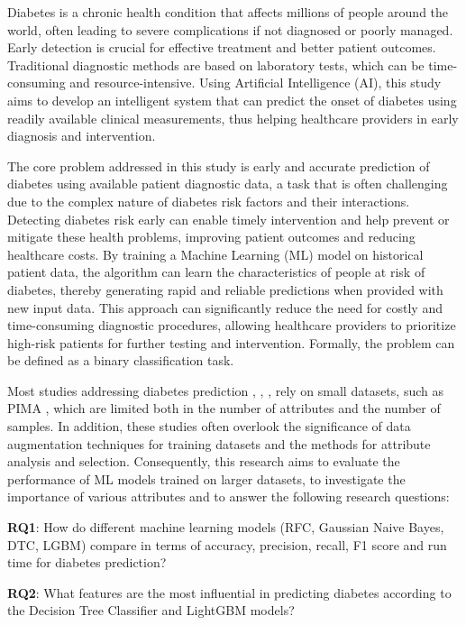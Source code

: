 \documentclass[runningheads]{llncs}
\begin{document}
Diabetes is a chronic health condition that affects millions of people around the world, often leading to severe complications if not diagnosed or poorly managed. Early detection is crucial for effective treatment and better patient outcomes. Traditional diagnostic methods are based on laboratory tests, which can be time-consuming and resource-intensive. Using Artificial Intelligence (AI), this study aims to develop an intelligent system that can predict the onset of diabetes using readily available clinical measurements, thus helping healthcare providers in early diagnosis and intervention. 

The core problem addressed in this study is early and accurate prediction of diabetes using available patient diagnostic data, a task that is often challenging due to the complex nature of diabetes risk factors and their interactions. Detecting diabetes risk early can enable timely intervention and help prevent or mitigate these health problems, improving patient outcomes and reducing healthcare costs.
By training a Machine Learning (ML) model on historical patient data, the algorithm can learn the characteristics of people at risk of diabetes, thereby generating rapid and reliable predictions when provided with new input data. This approach can significantly reduce the need for costly and time-consuming diagnostic procedures, allowing healthcare providers to prioritize high-risk patients for further testing and intervention. 
Formally, the problem can be defined as a binary classification task. 


Most studies addressing diabetes prediction \cite{FEBRIAN202321}, \cite{Dutta}, \cite{GANIE2022100092}, \cite{Xu2024} rely on small datasets, such as PIMA \cite{pimaDataset}, which are limited both in the number of attributes and the number of samples. In addition, these studies often overlook the significance of data augmentation techniques for training datasets and the methods for attribute analysis and selection. Consequently, this research aims to evaluate the performance of ML models trained on larger datasets, to investigate the importance of various attributes and to answer the following research questions:

\textbf{RQ1}: How do different machine learning models (RFC, Gaussian Naive Bayes, DTC, LGBM) compare in terms of accuracy, precision, recall, F1 score and run time for diabetes prediction?

\textbf{RQ2}: What features are the most influential in predicting diabetes according to the Decision Tree Classifier and LightGBM models?
\end{document}
